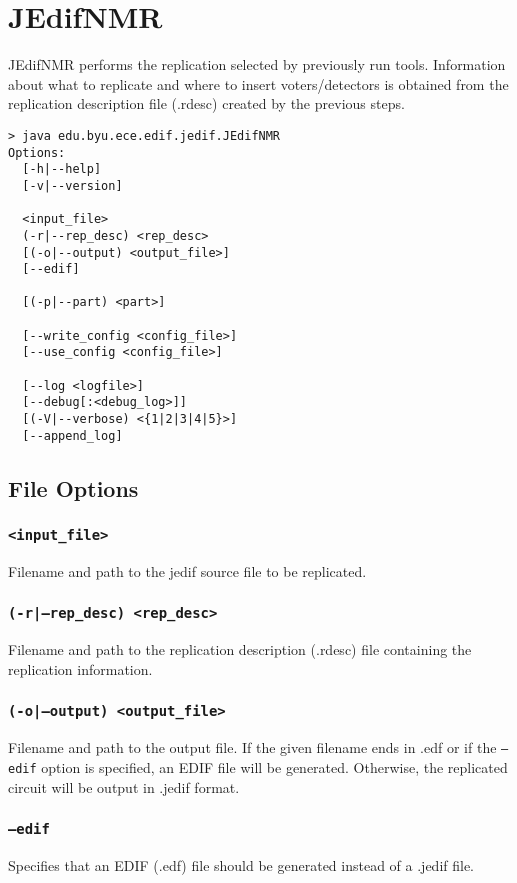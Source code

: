 \section{JEdifNMR}
JEdifNMR performs the replication selected by previously run
tools. Information about what to replicate and where to insert
voters/detectors is obtained from the replication description file
(.rdesc) created by the previous steps.

\begin{verbatim}
> java edu.byu.ece.edif.jedif.JEdifNMR
Options:
  [-h|--help]
  [-v|--version]

  <input_file>
  (-r|--rep_desc) <rep_desc>
  [(-o|--output) <output_file>]
  [--edif]

  [(-p|--part) <part>]
  
  [--write_config <config_file>]
  [--use_config <config_file>]

  [--log <logfile>]
  [--debug[:<debug_log>]]
  [(-V|--verbose) <{1|2|3|4|5}>]
  [--append_log]
\end{verbatim}

\subsection{File Options}

\subsubsection{\texttt{<input\_file>}}
Filename and path to the jedif source file to be
replicated.

\subsubsection{\texttt{(-r|--rep\_desc) <rep\_desc>}}
Filename and path to the replication description (.rdesc) file containing the
replication information.

\subsubsection{\texttt{(-o|--output) <output\_file>}}
Filename and path to the output file. If the given filename ends in .edf or if
the \texttt{--edif} option is specified, an EDIF file will be generated.
Otherwise, the replicated circuit will be output in .jedif format.

\subsubsection{\texttt{--edif}}
Specifies that an EDIF (.edf) file should be generated instead of a .jedif file.






